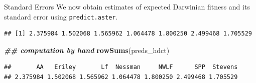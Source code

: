 \documentclass[
  ignorenonframetext,
]{beamer}
\newenvironment{Shaded}{\begin{snugshade}}{\end{snugshade}}
\newcommand{\AttributeTok}[1]{\textcolor[rgb]{0.13,0.29,0.53}{#1}}
\newcommand{\ConstantTok}[1]{\textcolor[rgb]{0.56,0.35,0.01}{#1}}
\newcommand{\DocumentationTok}[1]{\textcolor[rgb]{0.56,0.35,0.01}{\textbf{\textit{#1}}}}
\newcommand{\FunctionTok}[1]{\textcolor[rgb]{0.13,0.29,0.53}{\textbf{#1}}}
\newcommand{\NormalTok}[1]{#1}
\newcommand{\OtherTok}[1]{\textcolor[rgb]{0.56,0.35,0.01}{#1}}
\newcommand{\SpecialCharTok}[1]{\textcolor[rgb]{0.81,0.36,0.00}{\textbf{#1}}}
\begin{document}
\begin{frame}[fragile]{Standard Errors}
\protect\hypertarget{standard-errors}{}
We now obtain estimates of expected Darwinian fitness and its standard
error using \texttt{predict.aster}.

\vspace{12pt}
\tiny

\begin{Shaded}
\end{Shaded}

\begin{verbatim}
## [1] 2.375984 1.502068 1.565962 1.064478 1.800250 2.499468 1.705529
\end{verbatim}

\begin{Shaded}
\begin{Highlighting}[]
\DocumentationTok{\#\# computation by hand}
\FunctionTok{rowSums}\NormalTok{(preds\_hdct)}
\end{Highlighting}
\end{Shaded}

\begin{verbatim}
##       AA   Eriley       Lf  Nessman     NWLF      SPP  Stevens 
## 2.375984 1.502068 1.565962 1.064478 1.800250 2.499468 1.705529
\end{verbatim}
\end{frame}
\end{document}
